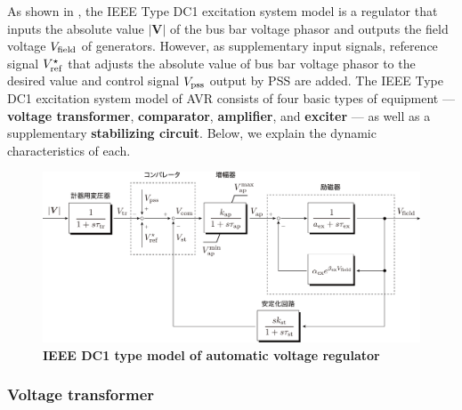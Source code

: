 \documentclass[tombow,dvipdfmx]{corona-a5-1.1}
\begin{document}
As shown in , the IEEE Type DC1 excitation system model is a regulator that inputs the absolute value $|\bm{V}|$ of the bus bar voltage phasor and outputs the field voltage $V_{\rm field}$ of generators.
However, as supplementary input signals, reference signal $V_{\rm ref}^{\star}$ that adjusts the absolute value of bus bar voltage phasor to the desired value and control signal $V_{\rm pss}$ output by PSS are added.
The IEEE Type DC1 excitation system model of AVR consists of four basic types of equipment — \textbf{voltage transformer}, \textbf{comparator}, \textbf{amplifier}, and \textbf{exciter} — as well as a supplementary \textbf{stabilizing circuit}.
Below, we explain the dynamic characteristics of each.


\begin{figure}[t]
\centering
\includegraphics[width = 0.99\linewidth]{figs/avrdc1}
\medskip
\caption{\textbf{IEEE DC1 type model of automatic voltage regulator}}
\label{fig:avrdc1}
\medskip
\end{figure}


\smallskip
\subsubsection{Voltage transformer}
\end{document}
